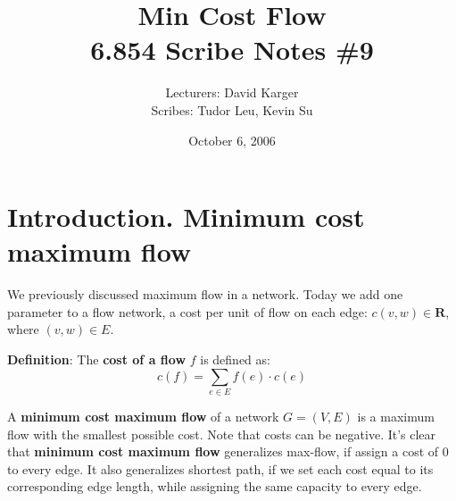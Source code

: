 \documentclass{article}
\title{Min Cost Flow \\ 6.854 Scribe Notes \#9}
\date{October 6, 2006}
\author{Lecturers: David Karger\\ Scribes: Tudor Leu, Kevin Su}
\begin{document}
%
%
%
%

%



\section{Introduction. Minimum cost maximum flow}

We previously discussed maximum flow in a network. Today we add one parameter to a flow network, a cost per unit of flow on each edge: $c(v, w) \in \mathbf{R}$, where $(v, w) \in E$.

\textbf{Definition}:
The {\bf cost of a flow} $f$ is defined as:
\begin{displaymath}
c(f) = \sum_{e \in E} f(e)\cdot c(e)
\end{displaymath}

A {\bf minimum cost maximum flow} of a network $G=(V, E)$ is a maximum flow with the smallest possible cost. Note that costs can be negative.  It's clear that {\bf minimum cost maximum flow} generalizes max-flow, if assign a cost of $0$ to every edge.  It also generalizes shortest path, if we set each cost equal to its corresponding edge length, while assigning the same capacity to every edge.
\end{document}
